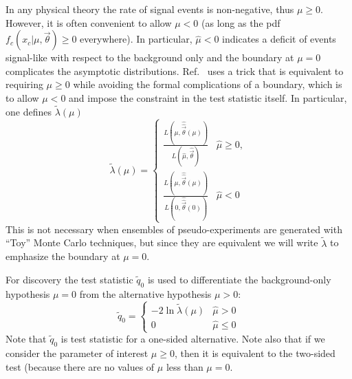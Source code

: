 In any physical theory the rate of signal events is non-negative, thus $\mu\ge 0$.  However, it is often convenient to allow $\mu<0$ (as long as the pdf $f_c(x_c | \mu,\vec\theta)\ge 0$ everywhere).  In particular, $\hat\mu<0$ indicates a deficit of events signal-like with respect to the background only and the boundary at $\mu=0$ complicates the asymptotic distributions.  Ref.~\cite{asimov} uses a  trick that is equivalent to requiring $\mu\ge 0$ while avoiding the formal complications of a boundary, which is to allow $\mu< 0$ and   impose the constraint in the test statistic itself.  In particular, one defines $\tilde \lambda(\mu)$
\begin{equation}
\tilde{\lambda}({\mu}) =  \left\{ 
\begin{array}{ll} \frac{ L(\mu, \hat{\hat{\vec{\theta}}}(\mu)) }
{L(\hat{\mu}, \hat{\vec{\theta}}) } & \hat{\mu} \ge 0 , \\
\frac{ L(\mu, \hat{\hat{\vec{\theta}}}(\mu)) }  {L(0,
\hat{\hat{\vec{\theta}}}(0)) } & \hat{\mu} < 0 
              \end{array} \right.
\end{equation}
This is not necessary when ensembles of pseudo-experiments are generated with ``Toy'' Monte Carlo techniques, but since they are equivalent we will write $\tilde\lambda$ to emphasize the boundary at $\mu=0$.


For discovery the test statistic $\tilde{q}_0$  is used to differentiate the background-only hypothesis $\mu=0$ from the alternative hypothesis $\mu>0$:
\begin{equation}
\tilde{q}_{0} =  \left\{ \!
\! \begin{array}{ll} - 2 \ln \tilde{\lambda}(\mu)  & \hat{\mu} > 0
\\ 0 & \hat{\mu} \le 0 
              \end{array} \right.  
\end{equation}
Note that $\tilde{q}_0$ is test statistic for a one-sided alternative.  Note also that if we consider the parameter of interest $\mu\ge 0$, then it is equivalent to the two-sided test (because there are no values of $\mu$ less than $\mu=0$. 


